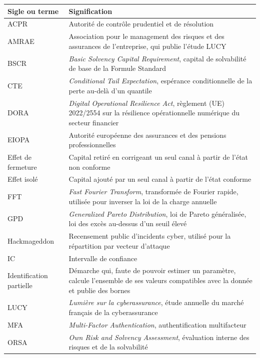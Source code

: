 \begin{center}\small
\renewcommand{\arraystretch}{1.15}
\begin{longtable}{@{}>{\raggedright\arraybackslash}p{2.6cm}>{\raggedright\arraybackslash}p{12.2cm}@{}}
\toprule
\textbf{Sigle ou terme} & \textbf{Signification} \\
\midrule
\endhead
ACPR & Autorité de contrôle prudentiel et de résolution \\
AMRAE & Association pour le management des risques et des assurances de l'entreprise, qui publie l'étude LUCY \\
BSCR & \emph{Basic Solvency Capital Requirement}, capital de solvabilité de base de la Formule Standard \\
CTE & \emph{Conditional Tail Expectation}, espérance conditionnelle de la perte au-delà d'un quantile \\
DORA & \emph{Digital Operational Resilience Act}, règlement (UE) 2022/2554 sur la résilience opérationnelle numérique du secteur financier \\
EIOPA & Autorité européenne des assurances et des pensions professionnelles \\
Effet de fermeture & Capital retiré en corrigeant un seul canal à partir de l'état non conforme \\
Effet isolé & Capital ajouté par un seul canal à partir de l'état conforme \\
FFT & \emph{Fast Fourier Transform}, transformée de Fourier rapide, utilisée pour inverser la loi de la charge annuelle \\
GPD & \emph{Generalized Pareto Distribution}, loi de Pareto généralisée, loi des excès au-dessus d'un seuil élevé \\
Hackmageddon & Recensement public d'incidents cyber, utilisé pour la répartition par vecteur d'attaque \\
IC & Intervalle de confiance \\
Identification partielle & Démarche qui, faute de pouvoir estimer un paramètre, calcule l'ensemble de ses valeurs compatibles avec la donnée et publie des bornes \\
LUCY & \emph{Lumière sur la cyberassurance}, étude annuelle du marché français de la cyberassurance \\
MFA & \emph{Multi-Factor Authentication}, authentification multifacteur \\
ORSA & \emph{Own Risk and Solvency Assessment}, évaluation interne des risques et de la solvabilité \\

\end{longtable}
\end{center}
